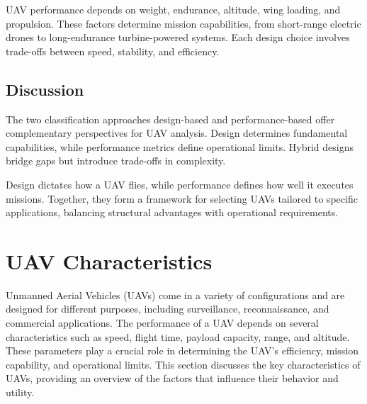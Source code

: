 UAV performance depends on weight, endurance, altitude, wing loading, and propulsion. These factors determine mission capabilities, from short-range electric drones to long-endurance turbine-powered systems. Each design choice involves trade-offs between speed, stability, and efficiency.



\subsection{Discussion }

The two classification approaches design-based  and performance-based offer complementary perspectives for UAV analysis. Design determines fundamental capabilities, while performance metrics define operational limits. Hybrid designs bridge gaps but introduce trade-offs in complexity.

\vspace{0.5cm}

Design dictates how a UAV flies, while performance defines how well it executes missions. Together, they form a framework for selecting UAVs tailored to specific applications, balancing structural advantages with operational requirements.

\subsubsection{}





\section{UAV Characteristics}

Unmanned Aerial Vehicles (UAVs) come in a variety of configurations and are designed for different purposes, including surveillance, reconnaissance, and commercial applications. The performance of a UAV depends on several characteristics such as speed, flight time, payload capacity, range, and altitude. These parameters play a crucial role in determining the UAV's efficiency, mission capability, and operational limits. This section discusses the key characteristics of UAVs, providing an overview of the factors that influence their behavior and utility.


